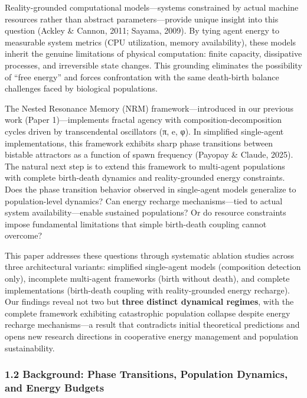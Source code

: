 \documentclass[
]{article}
\begin{document}
Reality-grounded computational models---systems constrained by actual
machine resources rather than abstract parameters---provide unique
insight into this question (Ackley \& Cannon, 2011; Sayama, 2009). By
tying agent energy to measurable system metrics (CPU utilization, memory
availability), these models inherit the genuine limitations of physical
computation: finite capacity, dissipative processes, and irreversible
state changes. This grounding eliminates the possibility of ``free
energy'' and forces confrontation with the same death-birth balance
challenges faced by biological populations.

The Nested Resonance Memory (NRM) framework---introduced in our previous
work (Paper 1)---implements fractal agency with
composition-decomposition cycles driven by transcendental oscillators
(π, e, φ). In simplified single-agent implementations, this framework
exhibits sharp phase transitions between bistable attractors as a
function of spawn frequency (Payopay \& Claude, 2025). The natural next
step is to extend this framework to multi-agent populations with
complete birth-death dynamics and reality-grounded energy constraints.
Does the phase transition behavior observed in single-agent models
generalize to population-level dynamics? Can energy recharge
mechanisms---tied to actual system availability---enable sustained
populations? Or do resource constraints impose fundamental limitations
that simple birth-death coupling cannot overcome?

This paper addresses these questions through systematic ablation studies
across three architectural variants: simplified single-agent models
(composition detection only), incomplete multi-agent frameworks (birth
without death), and complete implementations (birth-death coupling with
reality-grounded energy recharge). Our findings reveal not two but
\textbf{three distinct dynamical regimes}, with the complete framework
exhibiting catastrophic population collapse despite energy recharge
mechanisms---a result that contradicts initial theoretical predictions
and opens new research directions in cooperative energy management and
population sustainability.

\subsubsection{1.2 Background: Phase Transitions, Population Dynamics,
and Energy
Budgets}\label{background-phase-transitions-population-dynamics-and-energy-budgets}
\end{document}
